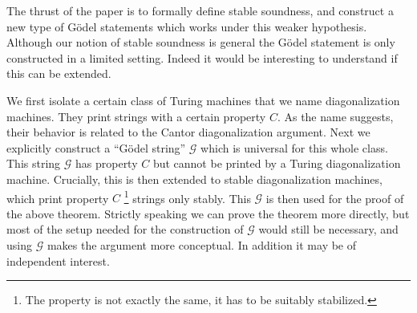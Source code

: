 \documentclass{amsart}  %
\numberwithin{equation}{section}
\theoremstyle{definition}
\theoremstyle{remark}
\begin{document}
{%
%   
%
%

The thrust of the paper is to formally define stable soundness, and construct a new type of G\"odel statements which works under this weaker hypothesis. Although our notion of stable soundness is general the G\"odel statement is only constructed in a limited setting. Indeed it would be interesting to understand if this can be extended.

We first isolate a certain class of Turing machines that we name diagonalization machines. They print strings with a certain property $C$. As the name suggests, their behavior is related to the Cantor diagonalization argument.  Next we explicitly construct a ``G\"odel string'' $\mathcal{G}$ which is universal for this whole class. 
This string $\mathcal{G}$ has property $C$ but cannot be printed by a Turing diagonalization machine. Crucially, this is then extended to stable diagonalization machines, which print property  $C$ \footnote {The property is not exactly the same, it has to be suitably stabilized.} strings only stably. This $\mathcal{G}$ is then used for the proof of the above theorem.
Strictly speaking we can prove the theorem more directly, but most of the setup needed for the construction of $\mathcal{G}$ would still be necessary, and using $\mathcal{G}$ makes the argument more conceptual. In addition it may be of independent interest.

}
\end{document}
